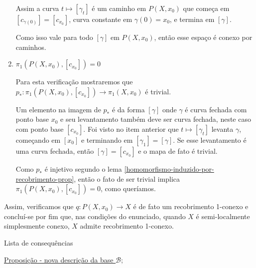 \begin{dem}
\begin{enumerate}
            Assim a curva $t\mapsto [\gamma_t]$ é um caminho em $P(X,x_0)$ que começa em $[c_{\gamma(0)}]=[c_{x_0}]$, curva constante em $\gamma(0)=x_0$, e termina em $[\gamma]$.

            Como isso vale para todo $[\gamma]$ em $P(X, x_0)$, então esse espaço é conexo por caminhos.\newline
        
        \item $\pi_1(P(X,x_0), [c_{x_0}])=0$\newline
        
            Para esta verificação mostraremos que $p_*: \pi_1(P(X,x_0), [c_{x_0}])\rightarrow \pi_1(X,x_0)$ é trivial.\newline

            Um elemento na imagem de $p_*$ é da forma $[\gamma]$ onde $\gamma$ é curva fechada com ponto base $x_0$ e seu levantamento também deve ser curva fechada, neste caso com ponto base $[c_{x_0}]$. Foi visto no item anterior que $t\mapsto [\gamma_t]$ levanta $\gamma$, começando em $[x_0]$ e terminando em $[\gamma_1]=[\gamma]$. Se esse levantamento é uma curva fechada, então $[\gamma]=[c_{x_0}]$ e o mapa de fato é trivial.

            Como $p_*$ é injetivo segundo o lema \ref{homomorfismo-induzido-por-recobrimento-prop}, então o fato de ser trivial implica $\pi_1(P(X,x_0), [c_{x_0}])=0$, como queríamos.\newline
        
    \end{enumerate}

    Assim, verificamos que $q: P(X,x_0)\rightarrow X$ é de fato um recobrimento 1-conexo e concluí-se por fim que, nas condições do enunciado, quando $X$ é semi-localmente simplesmente conexo, $X$ admite recobrimento 1-conexo.
    
\end{dem}

\begin{titlemize}{Lista de consequências}
	\item \hyperref[pertence-a-base-se-e-somente-se-possui-i-trivial]{Proposição - nova descrição da base $\mathcal{B}$};\\ %
\end{titlemize}
